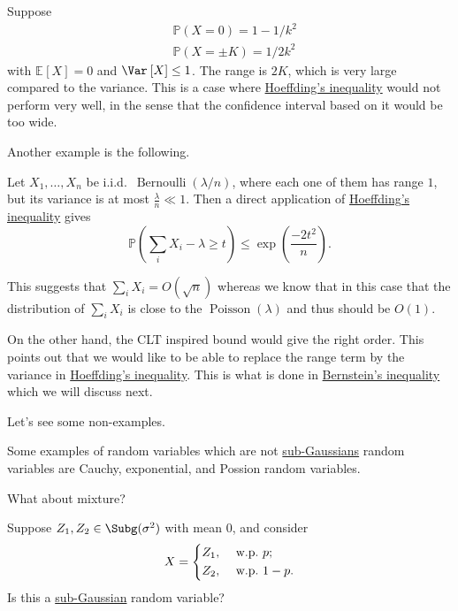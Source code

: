 \begin{eg}
	Suppose
	\[
		\begin{split}
			&\mathbb{P} (X=0) = 1 - 1/k^2\\
			&\mathbb{P} (X=\pm K) = 1/2k^2
		\end{split}
	\]
	with \(\mathbb{E}_{}\left[X \right] =0\) and \(\Var_{}\left[X \right] \leq 1\). The range is \(2K\), which is very large compared to the variance. This is a case where \hyperref[thm:Hoeffding-inequality]{Hoeffding's inequality} would not perform very well, in the sense that the confidence interval based on it would be too wide.
\end{eg}

Another example is the following.

\begin{eg}
	Let \(X_1, \dots, X_n\) be i.i.d.\ \(\mathop{\mathrm{Bernoulli}}(\lambda / n)\), where each one of them has range \(1\), but its variance is at most \(\frac{\lambda}{n} \ll 1\). Then a direct application of \hyperref[thm:Hoeffding-inequality]{Hoeffding's inequality} gives
	\[
		\mathbb{P} \left( \sum_{i} X_i - \lambda \geq t \right) \leq \exp\left( \frac{-2t^2}{n} \right) .
	\]

	This suggests that \(\sum_{i} X_i = O(\sqrt{n})\) whereas we know that in this case that the distribution of \(\sum_{i} X_i\) is close to the \(\mathop{\mathrm{Poisson}}(\lambda)\) and thus should be \(O(1)\).

	On the other hand, the CLT inspired bound would give the right order. This points out that we would like to be able to replace the range term by the variance in \hyperref[thm:Hoeffding-inequality]{Hoeffding's inequality}. This is what is done in \hyperref[thm:Bernstein-inequality]{Bernstein's inequality} which we will discuss next.
\end{eg}

Let's see some non-examples.

\begin{eg}
	Some examples of random variables which are not \hyperref[def:sub-Gaussian]{sub-Gaussians} random variables are Cauchy, exponential, and Possion random variables.
\end{eg}

What about mixture?

\begin{problem*}
	Suppose \(Z_1, Z_2 \in \Subg(\sigma ^{2} ) \) with mean \(0\), and consider
	\[
		X = \begin{dcases}
			Z_1, & \text{ w.p.\ } p ;   \\
			Z_2, & \text{ w.p.\ } 1-p .
		\end{dcases}
	\]
	Is this a \hyperref[def:sub-Gaussian]{sub-Gaussian} random variable?
\end{problem*}

